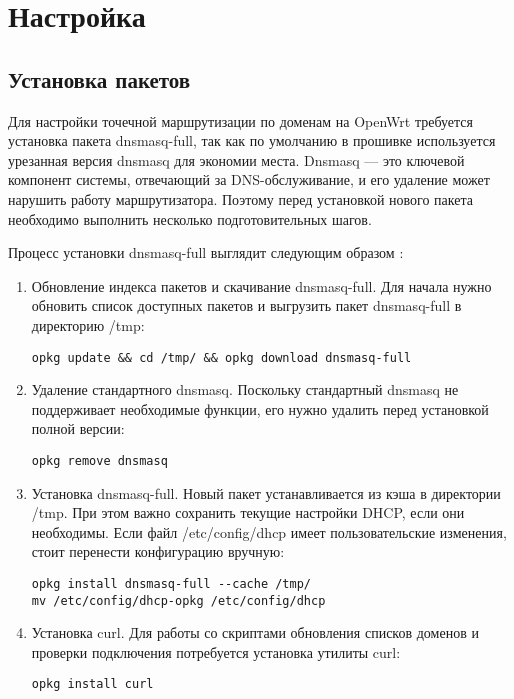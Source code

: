 \section{Настройка}

\subsection{Установка пакетов}

Для настройки точечной маршрутизации по доменам на OpenWrt требуется установка пакета dnsmasq-full, так как по умолчанию в прошивке используется урезанная версия dnsmasq для экономии места. Dnsmasq — это ключевой компонент системы, отвечающий за DNS-обслуживание, и его удаление может нарушить работу маршрутизатора. Поэтому перед установкой нового пакета необходимо выполнить несколько подготовительных шагов.

Процесс установки dnsmasq-full выглядит следующим образом \cite{openwrt}:

\begin{enumerate}
    \item Обновление индекса пакетов и скачивание dnsmasq-full. Для начала нужно обновить список доступных пакетов и выгрузить пакет dnsmasq-full в директорию /tmp:

\begin{lstlisting}[frame=rlbt]
opkg update && cd /tmp/ && opkg download dnsmasq-full
\end{lstlisting}

    \item Удаление стандартного dnsmasq. Поскольку стандартный dnsmasq не поддерживает необходимые функции, его нужно удалить перед установкой полной версии:

\begin{lstlisting}[frame=rlbt]
opkg remove dnsmasq
\end{lstlisting}

    \item Установка dnsmasq-full. Новый пакет устанавливается из кэша в директории /tmp. При этом важно сохранить текущие настройки DHCP, если они необходимы. Если файл /etc/config/dhcp имеет пользовательские изменения, стоит перенести конфигурацию вручную:

\begin{lstlisting}[frame=rlbt]
opkg install dnsmasq-full --cache /tmp/
mv /etc/config/dhcp-opkg /etc/config/dhcp
\end{lstlisting}

    \item Установка curl. Для работы со скриптами обновления списков доменов и проверки подключения потребуется установка утилиты curl:

\begin{lstlisting}[frame=rlbt]
    opkg install curl
\end{lstlisting}

\end{enumerate}

